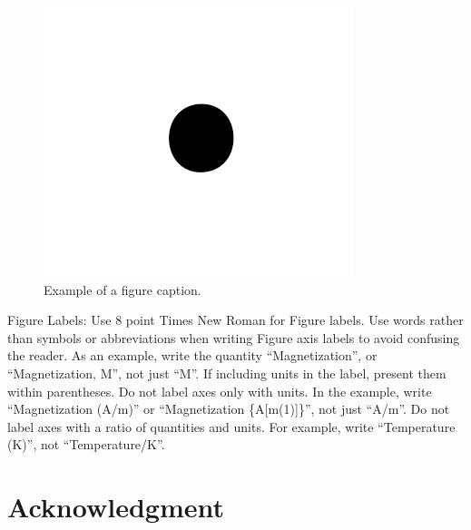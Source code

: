 \documentclass[conference]{IEEEtran}
\begin{document}

\begin{figure}[htbp]
\centerline{\includegraphics{fig1.png}}
\caption{Example of a figure caption.}
\label{fig}
\end{figure}

Figure Labels: Use 8 point Times New Roman for Figure labels. Use words 
rather than symbols or abbreviations when writing Figure axis labels to 
avoid confusing the reader. As an example, write the quantity 
``Magnetization'', or ``Magnetization, M'', not just ``M''. If including 
units in the label, present them within parentheses. Do not label axes only 
with units. In the example, write ``Magnetization (A/m)'' or ``Magnetization 
\{A[m(1)]\}'', not just ``A/m''. Do not label axes with a ratio of 
quantities and units. For example, write ``Temperature (K)'', not 
``Temperature/K''.

\section*{Acknowledgment}
\end{document}
